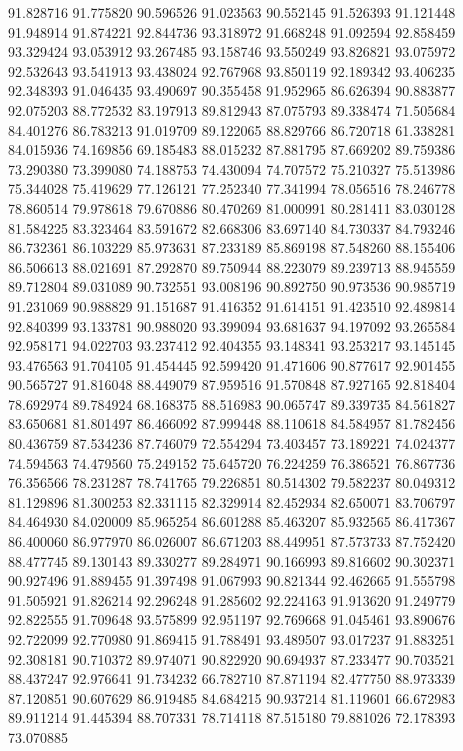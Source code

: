 91.828716
91.775820
90.596526
91.023563
90.552145
91.526393
91.121448
91.948914
91.874221
92.844736
93.318972
91.668248
91.092594
92.858459
93.329424
93.053912
93.267485
93.158746
93.550249
93.826821
93.075972
92.532643
93.541913
93.438024
92.767968
93.850119
92.189342
93.406235
92.348393
91.046435
93.490697
90.355458
91.952965
86.626394
90.883877
92.075203
88.772532
83.197913
89.812943
87.075793
89.338474
71.505684
84.401276
86.783213
91.019709
89.122065
88.829766
86.720718
61.338281
84.015936
74.169856
69.185483
88.015232
87.881795
87.669202
89.759386
73.290380
73.399080
74.188753
74.430094
74.707572
75.210327
75.513986
75.344028
75.419629
77.126121
77.252340
77.341994
78.056516
78.246778
78.860514
79.978618
79.670886
80.470269
81.000991
80.281411
83.030128
81.584225
83.323464
83.591672
82.668306
83.697140
84.730337
84.793246
86.732361
86.103229
85.973631
87.233189
85.869198
87.548260
88.155406
86.506613
88.021691
87.292870
89.750944
88.223079
89.239713
88.945559
89.712804
89.031089
90.732551
93.008196
90.892750
90.973536
90.985719
91.231069
90.988829
91.151687
91.416352
91.614151
91.423510
92.489814
92.840399
93.133781
90.988020
93.399094
93.681637
94.197092
93.265584
92.958171
94.022703
93.237412
92.404355
93.148341
93.253217
93.145145
93.476563
91.704105
91.454445
92.599420
91.471606
90.877617
92.901455
90.565727
91.816048
88.449079
87.959516
91.570848
87.927165
92.818404
78.692974
89.784924
68.168375
88.516983
90.065747
89.339735
84.561827
83.650681
81.801497
86.466092
87.999448
88.110618
84.584957
81.782456
80.436759
87.534236
87.746079
72.554294
73.403457
73.189221
74.024377
74.594563
74.479560
75.249152
75.645720
76.224259
76.386521
76.867736
76.356566
78.231287
78.741765
79.226851
80.514302
79.582237
80.049312
81.129896
81.300253
82.331115
82.329914
82.452934
82.650071
83.706797
84.464930
84.020009
85.965254
86.601288
85.463207
85.932565
86.417367
86.400060
86.977970
86.026007
86.671203
88.449951
87.573733
87.752420
88.477745
89.130143
89.330277
89.284971
90.166993
89.816602
90.302371
90.927496
91.889455
91.397498
91.067993
90.821344
92.462665
91.555798
91.505921
91.826214
92.296248
91.285602
92.224163
91.913620
91.249779
92.822555
91.709648
93.575899
92.951197
92.769668
91.045461
93.890676
92.722099
92.770980
91.869415
91.788491
93.489507
93.017237
91.883251
92.308181
90.710372
89.974071
90.822920
90.694937
87.233477
90.703521
88.437247
92.976641
91.734232
66.782710
87.871194
82.477750
88.973339
87.120851
90.607629
86.919485
84.684215
90.937214
81.119601
66.672983
89.911214
91.445394
88.707331
78.714118
87.515180
79.881026
72.178393
73.070885
